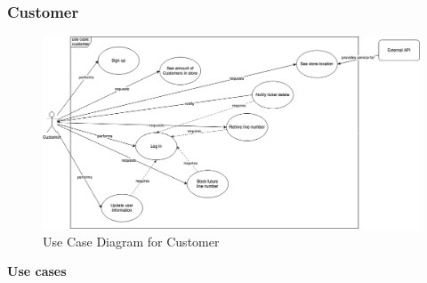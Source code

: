 

\subsubsection{Customer}

\begin{figure}[H]
    \centering
    \includegraphics[height=0.5\textwidth]{Images/UseCaseDiagrams/Customer.png}
    \caption{Use Case Diagram for Customer}
\end{figure}
\textbf{Use cases}
